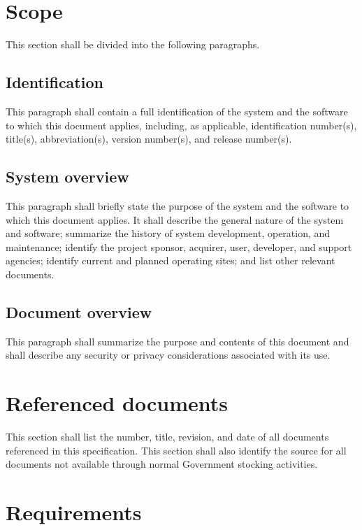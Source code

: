 \section{Scope}

This section shall be divided into the following paragraphs.

\subsection{Identification}

This paragraph shall contain a full identification of the system and the
software to which this document applies, including, as applicable,
identification number(s), title(s), abbreviation(s), version number(s),
and release number(s).

\subsection{System overview}

This paragraph shall briefly state the purpose of the system and the
software to which this document applies. It shall describe the general
nature of the system and software; summarize the history of system
development, operation, and maintenance; identify the project sponsor,
acquirer, user, developer, and support agencies; identify current and
planned operating sites; and list other relevant documents.

\subsection{Document overview}

This paragraph shall summarize the purpose and contents of this document
and shall describe any security or privacy considerations associated
with its use.

\section{Referenced documents}

This section shall list the number, title, revision, and date of all
documents referenced in this specification. This section shall also
identify the source for all documents not available through normal
Government stocking activities.

\section{Requirements}

